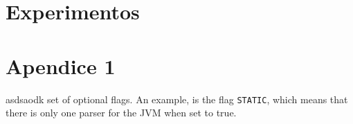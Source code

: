 \documentclass[cic,tc,english]{iiufrgs}
\begin{document}
\chapter{Experimentos}
\label{sec:orgheadline4}
\label{chapter.experiments} 






\appendix
\chapter{Apendice 1}
\label{sec:orgheadline5}
\label{ap.javacc}

asdsaodk
set of optional flags. An example, is the flag \texttt{STATIC}, which means
that there is only one parser for the JVM when set to true.
\end{document}
